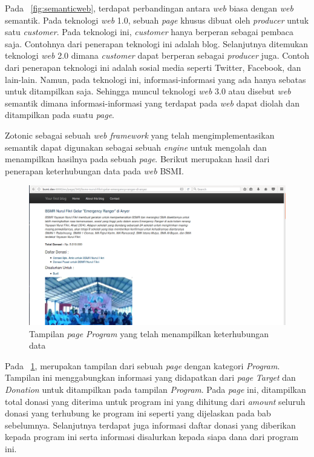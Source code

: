 Pada \pic~\ref{fig:semanticweb}, terdapat perbandingan antara \textit{web} biasa dengan \textit{web} semantik. Pada teknologi \textit{web} 1.0, sebuah \textit{page} khusus dibuat oleh \textit{producer} untuk satu \textit{customer}. Pada teknologi ini, \textit{customer} hanya berperan sebagai pembaca saja. Contohnya dari penerapan teknologi ini adalah blog. Selanjutnya ditemukan teknologi \textit{web} 2.0 dimana \textit{customer} dapat berperan sebagai \textit{producer} juga. Contoh dari penerapan teknologi ini adalah sosial media seperti Twitter, Facebook, dan lain-lain. Namun, pada teknologi ini, informasi-informasi yang ada hanya sebatas untuk ditampilkan saja. Sehingga muncul teknologi \textit{web} 3.0 atau disebut \textit{web} semantik dimana informasi-informasi yang terdapat pada \textit{web} dapat diolah dan ditampilkan pada suatu \textit{page}.

Zotonic sebagai sebuah \textit{web framework} yang telah mengimplementasikan semantik dapat digunakan sebagai sebuah \textit{engine} untuk mengolah dan menampilkan hasilnya pada sebuah \textit{page}. Berikut merupakan hasil dari penerapan keterhubungan data pada \textit{web} BSMI.

\begin{figure}
	\centering
	\includegraphics[width=1\textwidth]
	{pics/100-program.png}
	\caption{Tampilan \textit{page Program} yang telah menampilkan keterhubungan data}
	\label{fig:programlinked}
\end{figure}
\vspace{-0.3cm}

Pada \pic~\ref{fig:programlinked}, merupakan tampilan dari sebuah \textit{page} dengan kategori \textit{Program}. Tampilan ini menggabungkan informasi yang didapatkan dari \textit{page} \textit{Target} dan \textit{Donation} untuk ditampilkan pada tampilan \textit{Program}. Pada \textit{page} ini, ditampilkan total donasi yang diterima untuk program ini yang dihitung dari \textit{amount} seluruh donasi yang terhubung ke program ini seperti yang dijelaskan pada bab sebelumnya. Selanjutnya terdapat juga informasi daftar donasi yang diberikan kepada program ini serta informasi disalurkan kepada siapa dana dari program ini.

